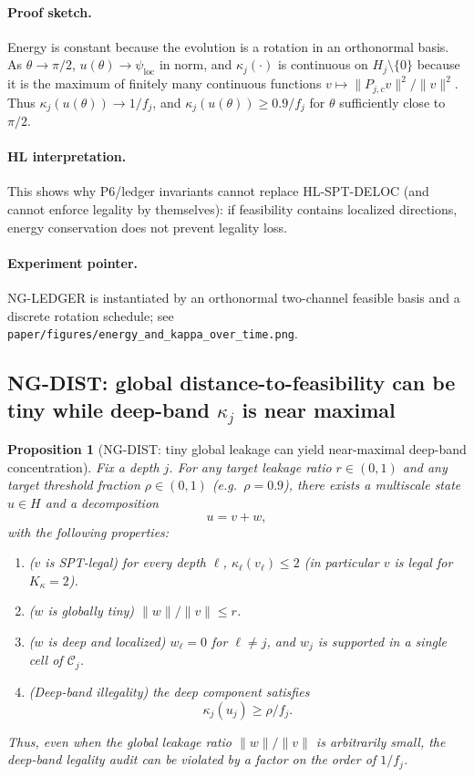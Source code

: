 \documentclass[11pt]{article}
\newtheorem{proposition}[definition]{Proposition}
\begin{document}
\paragraph{Proof sketch.}
Energy is constant because the evolution is a rotation in an orthonormal basis.
As $\theta\to \pi/2$, $u(\theta)\to \psi_{\mathrm{loc}}$ in norm, and $\kappa_j(\cdot)$ is continuous on $H_j\setminus\{0\}$ because it is the maximum of finitely many continuous functions
$v\mapsto \|P_{j,c}v\|^2/\|v\|^2$.
Thus $\kappa_j(u(\theta))\to 1/f_j$, and $\kappa_j(u(\theta))\ge 0.9/f_j$ for $\theta$ sufficiently close to $\pi/2$.

\paragraph{HL interpretation.}
This shows why P6/ledger invariants cannot replace HL-SPT-DELOC (and cannot enforce legality by themselves): if feasibility contains localized directions, energy conservation does not prevent legality loss.

\paragraph{Experiment pointer.}
NG-LEDGER is instantiated by an orthonormal two-channel feasible basis and a discrete rotation schedule; see \nolinkurl{paper/figures/energy_and_kappa_over_time.png}.

\subsection{NG-DIST: global distance-to-feasibility can be tiny while deep-band $\kappa_j$ is near maximal}

\begin{proposition}[NG-DIST: tiny global leakage can yield near-maximal deep-band concentration]\label{prop:ng-dist}
Fix a depth $j$.
For any target leakage ratio $r\in(0,1)$ and any target threshold fraction $\rho\in(0,1)$ (e.g.\ $\rho=0.9$), there exists a multiscale state $u\in H$ and a decomposition
\[
u = v + w,
\]
with the following properties:
\begin{enumerate}
\item (\emph{$v$ is SPT-legal}) for every depth $\ell$, $\kappa_\ell(v_\ell)\le 2$ (in particular $v$ is legal for $K_\kappa=2$).
\item (\emph{$w$ is globally tiny}) $\|w\|/\|v\| \le r$.
\item (\emph{$w$ is deep and localized}) $w_\ell=0$ for $\ell\neq j$, and $w_j$ is supported in a single cell of $\mathcal{C}_j$.
\item (\emph{Deep-band illegality}) the deep component satisfies
\[
\kappa_j(u_j)\ge \rho/f_j.
\]
\end{enumerate}
Thus, even when the global leakage ratio $\|w\|/\|v\|$ is arbitrarily small, the deep-band legality audit can be violated by a factor on the order of $1/f_j$.
\end{proposition}
\end{document}
